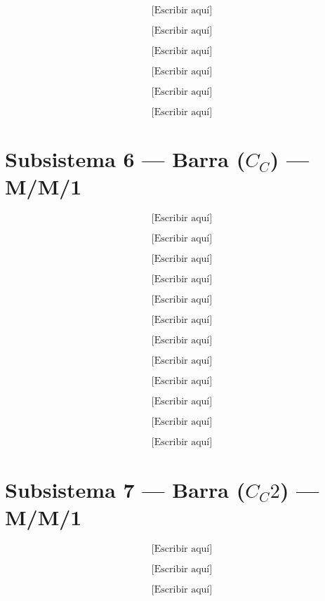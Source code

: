 \documentclass[12pt,a4paper]{article}
\begin{document}
\[
\text{[Escribir aquí]} \tag{5.7}
\]

\[
\text{[Escribir aquí]} \tag{5.8}
\]

\[
\text{[Escribir aquí]} \tag{5.9}
\]

\[
\text{[Escribir aquí]} \tag{5.10}
\]

\[
\text{[Escribir aquí]} \tag{5.11}
\]

\[
\text{[Escribir aquí]} \tag{5.12}
\]

\vspace{1cm}
\section*{Subsistema 6 — Barra ($C_C$) — M/M/1}

\[
\text{[Escribir aquí]} \tag{6.1}
\]

\[
\text{[Escribir aquí]} \tag{6.2}
\]

\[
\text{[Escribir aquí]} \tag{6.3}
\]

\[
\text{[Escribir aquí]} \tag{6.4}
\]

\[
\text{[Escribir aquí]} \tag{6.5}
\]

\[
\text{[Escribir aquí]} \tag{6.6}
\]

\[
\text{[Escribir aquí]} \tag{6.7}
\]

\[
\text{[Escribir aquí]} \tag{6.8}
\]

\[
\text{[Escribir aquí]} \tag{6.9}
\]

\[
\text{[Escribir aquí]} \tag{6.10}
\]

\[
\text{[Escribir aquí]} \tag{6.11}
\]

\[
\text{[Escribir aquí]} \tag{6.12}
\]

\vspace{1cm}
\section*{Subsistema 7 — Barra ($C_C 2$) — M/M/1}

\[
\text{[Escribir aquí]} \tag{7.1}
\]

\[
\text{[Escribir aquí]} \tag{7.2}
\]

\[
\text{[Escribir aquí]} \tag{7.3}
\]
\end{document}
